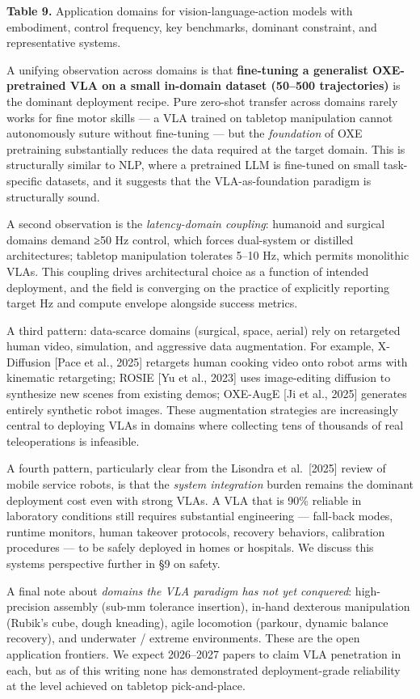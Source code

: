 \textbf{Table 9.} Application domains for vision-language-action models with embodiment, control frequency, key benchmarks, dominant constraint, and representative systems.

A unifying observation across domains is that \textbf{fine-tuning a generalist OXE-pretrained VLA on a small in-domain dataset (50--500 trajectories)} is the dominant deployment recipe. Pure zero-shot transfer across domains rarely works for fine motor skills --- a VLA trained on tabletop manipulation cannot autonomously suture without fine-tuning --- but the \emph{foundation} of OXE pretraining substantially reduces the data required at the target domain. This is structurally similar to NLP, where a pretrained LLM is fine-tuned on small task-specific datasets, and it suggests that the VLA-as-foundation paradigm is structurally sound.

A second observation is the \emph{latency-domain coupling}: humanoid and surgical domains demand ≥50 Hz control, which forces dual-system or distilled architectures; tabletop manipulation tolerates 5--10 Hz, which permits monolithic VLAs. This coupling drives architectural choice as a function of intended deployment, and the field is converging on the practice of explicitly reporting target Hz and compute envelope alongside success metrics.

A third pattern: data-scarce domains (surgical, space, aerial) rely on retargeted human video, simulation, and aggressive data augmentation. For example, X-Diffusion {[}Pace et al., 2025{]} retargets human cooking video onto robot arms with kinematic retargeting; ROSIE {[}Yu et al., 2023{]} uses image-editing diffusion to synthesize new scenes from existing demos; OXE-AugE {[}Ji et al., 2025{]} generates entirely synthetic robot images. These augmentation strategies are increasingly central to deploying VLAs in domains where collecting tens of thousands of real teleoperations is infeasible.

A fourth pattern, particularly clear from the Lisondra et al.~{[}2025{]} review of mobile service robots, is that the \emph{system integration} burden remains the dominant deployment cost even with strong VLAs. A VLA that is 90\% reliable in laboratory conditions still requires substantial engineering --- fall-back modes, runtime monitors, human takeover protocols, recovery behaviors, calibration procedures --- to be safely deployed in homes or hospitals. We discuss this systems perspective further in §9 on safety.

A final note about \emph{domains the VLA paradigm has not yet conquered}: high-precision assembly (sub-mm tolerance insertion), in-hand dexterous manipulation (Rubik's cube, dough kneading), agile locomotion (parkour, dynamic balance recovery), and underwater / extreme environments. These are the open application frontiers. We expect 2026--2027 papers to claim VLA penetration in each, but as of this writing none has demonstrated deployment-grade reliability at the level achieved on tabletop pick-and-place.

